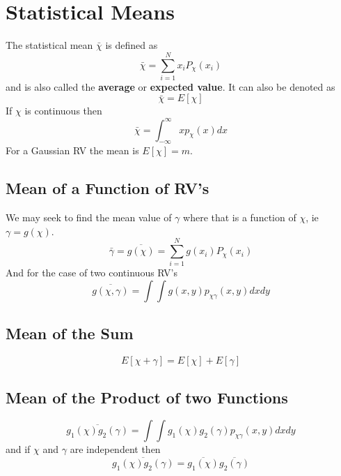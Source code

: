 \documentclass{article}
\begin{document}
    \section{Statistical Means}
    The statistical mean $\bar{\chi}$ is defined as
    \begin{equation}
        \bar{\chi} = \sum_{i=1}^{N}x_iP_{\chi}(x_i)
    \end{equation}
    and is also called the \textbf{average} or \textbf{expected value}. It can also be denoted as
    \begin{equation}
        \bar{\chi} = E[\chi]
    \end{equation}
    If $\chi$ is continuous then
    \begin{equation}
        \bar{\chi} = \int_{-\infty}^{\infty}xp_{\chi}(x)dx
    \end{equation}
    For a Gaussian RV the mean is $E[\chi] = m$.

    \subsection{Mean of a Function of RV's}
    We may seek to find the mean value of $\gamma$ where that is a function of $\chi$, ie $\gamma = g(\chi)$. 
    \begin{equation}
        \bar{\gamma} = \overline{g(\chi)} = \sum_{i=1}^{N}g(x_i)P_{\chi}(x_i)
    \end{equation}
    And for the case of two continuous RV's
    \begin{equation}
        \overline{g(\chi, \gamma)} = \int\int g(x, y)p_{\chi\gamma}(x, y)dx dy
    \end{equation}

    \subsection{Mean of the Sum}
    \begin{equation}
        E[\chi + \gamma] = E[\chi] + E[\gamma]
    \end{equation}
    \subsection{Mean of the Product of two Functions}
    \begin{equation}
        \overline{g_1(\chi)g_2(\gamma)} = \int\int g_1(\chi)g_2(\gamma)p_{\chi\gamma}(x, y)dx dy
    \end{equation}
    and if $\chi$ and $\gamma$ are independent then
    \begin{equation}
        \overline{g_1(\chi)g_2(\gamma)} =  \overline{g_1(\chi)}\overline{g_2(\gamma)}
    \end{equation}
\end{document}
